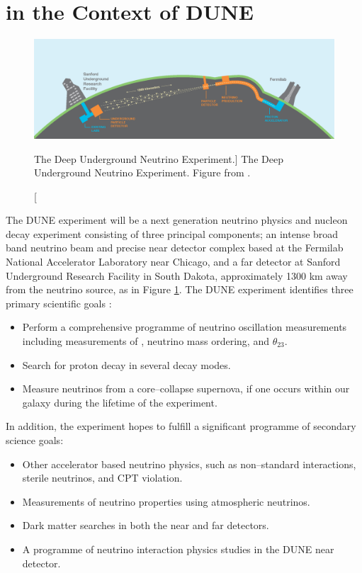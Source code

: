 \section{\protodune{} in the Context of DUNE} \label{sec:pdsp_dune}

\begin{figure}

	\centering

	\includegraphics[width=\textwidth]{figures/dune_baseline.png}

	\caption
	[The Deep Underground Neutrino Experiment.]
	{The Deep Underground Neutrino Experiment. Figure from \cite{Abi:2020wmh}.}

	\label{fig:dune_baseline}

\end{figure}

The DUNE experiment will be a next generation neutrino physics and nucleon decay
experiment consisting of three principal components; an intense broad band 
neutrino beam and precise near detector complex based at the Fermilab National 
Accelerator Laboratory near Chicago, and a far detector at Sanford Underground 
Research Facility in South Dakota, approximately 1300 km away from the 
neutrino source, as in Figure \ref{fig:dune_baseline}. The DUNE experiment 
identifies three primary scientific goals 
\cite{Abi:2020evt}:
\begin{itemize}
	\item Perform a comprehensive programme of neutrino oscillation measurements
		including measurements of \dcp{}, neutrino mass ordering, and $\theta_{23}$.
	\item Search for proton decay in several decay modes.
	\item Measure neutrinos from a core--collapse supernova, if one occurs within 
		our galaxy during the lifetime of the experiment.
\end{itemize}
In addition, the experiment hopes to fulfill a significant programme of
secondary science goals:
\begin{itemize}
	\item Other accelerator based neutrino physics, such as non--standard
		interactions, sterile neutrinos, and CPT violation.
	\item Measurements of neutrino properties using atmospheric neutrinos.
	\item Dark matter searches in both the near and far detectors.
	\item A programme of neutrino interaction physics studies in the DUNE near
		detector.
\end{itemize}

